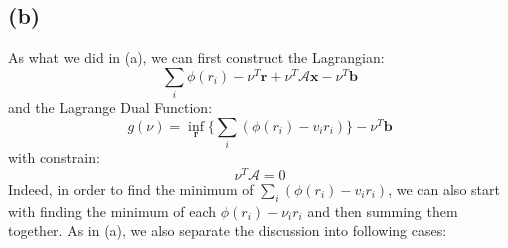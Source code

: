 \documentclass[10pt,a4paper]{article}
\begin{document}
\subsection*{(b)}
As what we did in (a), we can first construct the Lagrangian:
\begin{equation*}
	\displaystyle\sum_{i} \phi(r_{i}) - \nu^{T} \mathbf{r} + \nu^{T} \mathcal{A} \mathbf{x} - \nu^{T} \mathbf{b}
\end{equation*}
and the Lagrange Dual Function:
\begin{equation*}
	g(\nu) = \displaystyle\inf_{\mathbf{r}} \{ \displaystyle\sum_{i} (\phi(r_{i}) - v_{i} r_{i}) \} - \nu^{T} \mathbf{b}
\end{equation*}
with constrain:
\begin{equation*}
	\nu^{T} \mathcal{A} = 0
\end{equation*}
Indeed, in order to find the minimum of $\displaystyle\sum_{i} (\phi(r_{i}) - v_{i} r_{i})$, we can also start with finding the minimum of each $\phi(r_{i}) - \nu_{i} r_{i}$ and then summing them together. As in (a), we also separate the discussion into following cases:
\end{document}
